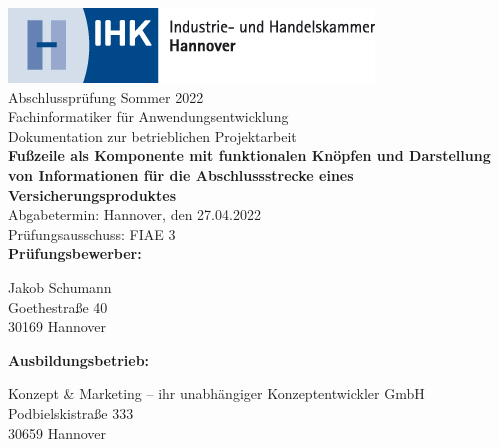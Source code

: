 \thispagestyle{empty}


\begin{center}
	\includegraphics[scale=0.9]{bilder/logo_ihkdata}\\[2ex]
	\Large{Abschlussprüfung Sommer 2022}\\[3ex]
	
	\Large{Fachinformatiker für Anwendungsentwicklung}\\
	\LARGE{Dokumentation zur betrieblichen Projektarbeit}\\[4ex]
	
	\huge{\textbf{Fußzeile als Komponente mit funktionalen Knöpfen und Darstellung von Informationen für die Abschlussstrecke eines Versicherungsproduktes}}\\[1ex]
	
	\normalsize
	Abgabetermin: Hannover, den 27.04.2022\\
	Prüfungsausschuss: FIAE 3\\[3em]
	
	\textbf{Prüfungsbewerber:}\\
	\begin{onehalfspace}
	Jakob Schumann\\
	Goethestraße 40\\
	30169 Hannover\\[5ex]
	\end{onehalfspace}
	 

	\textbf{Ausbildungsbetrieb:}\\
	\begin{onehalfspace}
	Konzept \& Marketing – ihr unabhängiger Konzeptentwickler GmbH\\
	Podbielskistraße 333\\
	30659 Hannover\\[5em]
	\end{onehalfspace}
\end{center}

